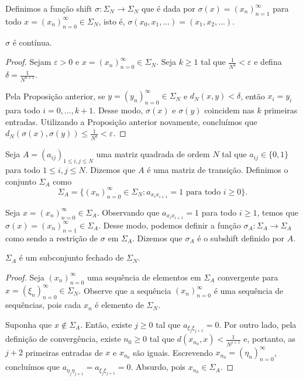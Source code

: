 Definimos a função shift $\sigma: \Sigma_N \to \Sigma_N$ que é dada por $\sigma(x) = (x_n)_{n=1}^\infty$ para todo $x = (x_n)_{n=0}^\infty \in \Sigma_N$, isto é, $\sigma(x_0, x_1, \dots) = (x_1, x_2, \dots)$.

\begin{proposition}
$\sigma$ é contínua.
\end{proposition}

\begin{proof}
Sejam $\varepsilon > 0$ e $x = (x_n)_{n=0}^\infty \in \Sigma_N$. Seja $k \geq 1$ tal que $\frac{1}{N^k} < \varepsilon$ e defina $\delta = \frac{1}{N^{k+1}}$.

Pela Proposição anterior, se $y = (y_n)_{n=0}^\infty \in \Sigma_N$ e $d_N(x, y) < \delta$, então $x_i = y_i$ para todo $i = 0, \dots, k+1$. Desse modo, $\sigma(x)$ e $\sigma(y)$ coincidem nas $k$ primeiras entradas. Utilizando a Proposição anterior novamente, concluímos que $d_N(\sigma(x), \sigma(y)) \leq \frac{1}{N^k} < \varepsilon$.
\end{proof}


Seja $A = (a_{ij})_{1 \leq i,j \leq N}$ uma matriz quadrada de ordem $N$ tal que $a_{ij} \in \{ 0, 1 \}$ para todo $1 \leq i,j \leq N$. Dizemos que $A$ é uma matriz de transição. Definimos o conjunto $\Sigma_A$ como
$$\Sigma_A = \{ (x_n)_{n=0}^{\infty} \in \Sigma_N : a_{x_i x_{i+1}} = 1 \textrm{ para todo } i \geq 0 \}.$$

Seja $x = (x_n)_{n=0}^{\infty} \in \Sigma_A$. Observando que $a_{x_i x_{i+1}} = 1$ para todo $i \geq 1$, temos que $\sigma(x) = (x_n)_{n=1}^\infty \in \Sigma_A$. Desse modo, podemos definir a função $\sigma_A: \Sigma_A \to \Sigma_A$ como sendo a restrição de $\sigma$ em $\Sigma_A$. Dizemos que $\sigma_A$ é o subshift definido por $A$.

\begin{proposition}
$\Sigma_A$ é um subconjunto fechado de $\Sigma_N$.
\end{proposition}


\begin{proof}
Seja $(x_n)_{n=0}^{\infty}$ uma sequência de elementos em $\Sigma_A$ convergente para $x = (\xi_n)_{n=0}^{\infty} \in \Sigma_N$. Observe que a sequência $(x_n)_{n=0}^{\infty}$ é uma sequência de sequências, pois cada $x_n$ é elemento de $\Sigma_N$.

Suponha que $x \notin \Sigma_A$. Então, existe $j \geq 0$ tal que $a_{\xi_j \xi_{j+1}} = 0$. Por outro lado, pela definição de convergência, existe $n_0 \geq 0$ tal que $d(x_{n_0}, x) < \frac{1}{N^{j+1}}$ e, portanto, as $j+2$ primeiras entradas de $x$ e $x_{n_0}$ são iguais. Escrevendo $x_{n_0} = (\eta_n)_{n=0}^\infty$, concluímos que $a_{\eta_j \eta_{j+1}} = a_{\xi_j \xi_{j+1}} = 0$. Absurdo, pois $x_{n_0} \in \Sigma_A$.
\end{proof}


